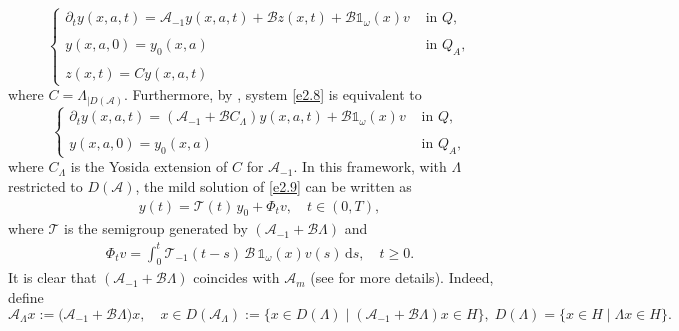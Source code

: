 \documentclass[10pt, a4]{amsart}
\theoremstyle{plain}
\theoremstyle{definition}
\theoremstyle{remark}
\numberwithin{equation}{section}
\begin{document}
\begin{equation}\label{e2.8}
\left\lbrace 
\begin{array}{ll}
\partial_{t}y(x,a,t)=\mathcal{A}_{-1} y(x,a,t)+\mathcal{B}z(x,t)+\mathcal{B}\mathds{1}_{\omega}(x)v & \text{ in }  Q,\\
\\y(x,a,0)=y_{0}(x,a)&\text{ in } Q_A,\\
\\z(x,t)=C y(x,a,t)
\end{array}
\right.
\end{equation}
where $C=\Lambda_{\mid D(\mathcal{A})}.$ Furthermore, by \cite[Theorem 4.1]{ref76}, system \eqref{e2.8} is equivalent to
\begin{equation}\label{e2.9}
\left\lbrace 
\begin{array}{ll}
\partial_{t}y(x,a,t)=(\mathcal{A}_{-1} +\mathcal{B}C_{\Lambda})y(x,a,t)+\mathcal{B}\mathds{1}_{\omega}(x)v & \text{ in }  Q,\\
\\y(x,a,0)=y_{0}(x,a)&\text{ in } Q_A,
\end{array}
\right.
\end{equation}
where $C_{\Lambda}$ is the Yosida extension of $C$ for $\mathcal{A}_{-1}.$  In this framework, with \(\Lambda\) restricted to \(D(\mathcal{A})\), the mild solution of \eqref{e2.9} can be written as
 \begin{align}
     y(t)
 = \mathcal{T}(t)\,y_0
 + \Phi_t v,
 \quad t\in(0,T),
 \end{align}
 where $\mathcal{T}$ is the semigroup generated by \((\mathcal{A}_{-1} + \mathcal{B}\Lambda)\) and  
 \begin{align}
    \Phi_t v
 = \int_{0}^{t}
   \mathcal{T}_{-1}(t - s)\,\mathcal{B}\,\mathds{1}_{\omega}(x)v(s)
 \,\mathrm{d}s,
 \quad t\ge0. 
 \end{align}
It is clear that \((\mathcal{A}_{-1} + \mathcal{B}\Lambda)\) coincides with \(\mathcal{A}_m\) (see \cite{ref76} for more details). Indeed, define
\[
\mathcal{A}_{\Lambda} x := \bigl(\mathcal{A}_{-1} + \mathcal{B}\Lambda\bigr)x,
\quad
x \in D(\mathcal{A}_{\Lambda})
:= \bigl\{x \in D(\Lambda) \mid (\mathcal{A}_{-1} + \mathcal{B}\Lambda)x \in H\bigr\},\; D(\Lambda)= \bigl\{x \in H \mid \Lambda x \in H\bigr\}.
\]
\end{document}
